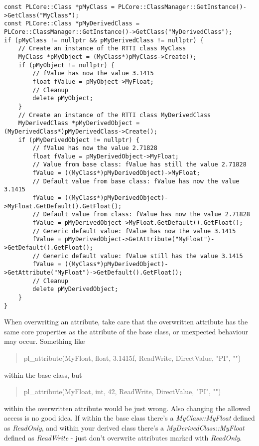 \begin{lstlisting}[label=Code:RTTIAttributeOverwriteUsage,caption={Using overwritten RTTI attributes}]
const PLCore::Class *pMyClass = PLCore::ClassManager::GetInstance()->GetClass("MyClass");
const PLCore::Class *pMyDerivedClass = PLCore::ClassManager::GetInstance()->GetClass("MyDerivedClass");
if (pMyClass != nullptr && pMyDerivedClass != nullptr) {
	// Create an instance of the RTTI class MyClass
	MyClass *pMyObject = (MyClass*)pMyClass->Create();
	if (pMyObject != nullptr) {
		// fValue has now the value 3.1415
		float fValue = pMyObject->MyFloat;
		// Cleanup
		delete pMyObject;
	}
	// Create an instance of the RTTI class MyDerivedClass
	MyDerivedClass *pMyDerivedObject = (MyDerivedClass*)pMyDerivedClass->Create();
	if (pMyDerivedObject != nullptr) {
		// fValue has now the value 2.71828
		float fValue = pMyDerivedObject->MyFloat;
		// Value from base class: fValue has still the value 2.71828
		fValue = ((MyClass*)pMyDerivedObject)->MyFloat;
		// Default value from base class: fValue has now the value 3.1415
		fValue = ((MyClass*)pMyDerivedObject)->MyFloat.GetDefault().GetFloat();
		// Default value from class: fValue has now the value 2.71828
		fValue = pMyDerivedObject->MyFloat.GetDefault().GetFloat();
		// Generic default value: fValue has now the value 3.1415
		fValue = pMyDerivedObject->GetAttribute("MyFloat")->GetDefault().GetFloat();
		// Generic default value: fValue still has the value 3.1415
		fValue = ((MyClass*)pMyDerivedObject)->GetAttribute("MyFloat")->GetDefault().GetFloat();
		// Cleanup
		delete pMyDerivedObject;
	}
}
\end{lstlisting}

When overwriting an attribute, take care that the overwritten attribute has the same core properties as the attribute of the base class, or unexpected behaviour may occur. Something like \begin{quote}pl\_attribute(MyFloat, float, 3.1415f, ReadWrite, DirectValue, "PI", "")\end{quote} within the base class, but \begin{quote}pl\_attribute(MyFloat, int, 42, ReadWrite, DirectValue, "PI", "")\end{quote} within the overwritten attribute would be just wrong. Also changing the allowed access is no good idea. If within the base class there's a \emph{MyClass::MyFloat} defined as \emph{ReadOnly}, and within your derived class there's a \emph{MyDerivedClass::MyFloat} defined as \emph{ReadWrite} - just don't overwrite attributes marked with \emph{ReadOnly}.

